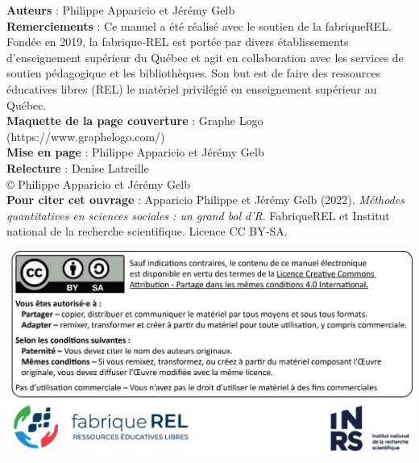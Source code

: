 

\textbf{Auteurs} : Philippe Apparicio et Jérémy Gelb\\[0.05in]
\textbf{Remerciements} : Ce manuel a été réalisé avec le soutien de la fabriqueREL. Fondée en 2019, la fabrique‑REL est portée par divers établissements d’enseignement supérieur du Québec et agit en collaboration avec les services de soutien pédagogique et les bibliothèques. Son but est de faire des ressources éducatives libres (REL) le matériel privilégié en enseignement supérieur au Québec.\\[0.05in]
\textbf{Maquette de la page couverture} : Graphe Logo (https://www.graphelogo.com/)\\[0.05in]
\textbf{Mise en page} : Philippe Apparicio et Jérémy Gelb\\[0.05in]
\textbf{Relecture} : Denise Latreille\\[0.2in]

© Philippe Apparicio et Jérémy Gelb\\[0.2in]

\textbf{Pour citer cet ouvrage} : Apparicio Philippe et Jérémy Gelb (2022). \textit{Méthodes quantitatives en sciences sociales : un grand bol d’R}. FabriqueREL et Institut national de la recherche scientifique. Licence CC BY‑SA.\\[1in]

\begin{center}
\includegraphics{images/licence_logos.png}
\end{center}

